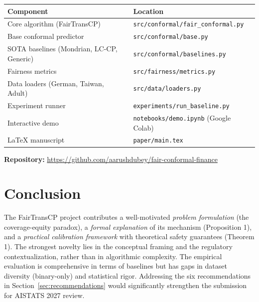 \documentclass[11pt,a4paper]{article}
\begin{document}
\begin{center}
\small
\begin{tabular}{@{}ll@{}}
\toprule
\textbf{Component} & \textbf{Location} \\
\midrule
Core algorithm (FairTransCP) & \texttt{src/conformal/fair\_conformal.py} \\
Base conformal predictor & \texttt{src/conformal/base.py} \\
SOTA baselines (Mondrian, LC-CP, Generic) & \texttt{src/conformal/baselines.py} \\
Fairness metrics & \texttt{src/fairness/metrics.py} \\
Data loaders (German, Taiwan, Adult) & \texttt{src/data/loaders.py} \\
Experiment runner & \texttt{experiments/run\_baseline.py} \\
Interactive demo & \texttt{notebooks/demo.ipynb} (Google Colab) \\
LaTeX manuscript & \texttt{paper/main.tex} \\
\bottomrule
\end{tabular}
\end{center}

\noindent\textbf{Repository:} \url{https://github.com/aarushdubey/fair-conformal-finance}

\section{Conclusion}
\label{sec:conclusion}

The FairTransCP project contributes a well-motivated \emph{problem formulation} (the coverage-equity paradox), a \emph{formal explanation} of its mechanism (Proposition 1), and a \emph{practical calibration framework} with theoretical safety guarantees (Theorem 1). The strongest novelty lies in the conceptual framing and the regulatory contextualization, rather than in algorithmic complexity. The empirical evaluation is comprehensive in terms of baselines but has gaps in dataset diversity (binary-only) and statistical rigor. Addressing the six recommendations in Section~\ref{sec:recommendations} would significantly strengthen the submission for AISTATS 2027 review.
\end{document}
